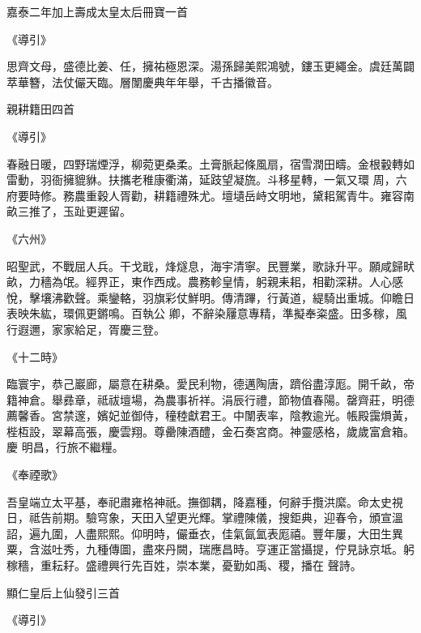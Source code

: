 \begin{pinyinscope}
 嘉泰二年加上壽成太皇太后冊寶一首



 《導引》



 思齊文母，盛德比姜、任，擁祐極恩深。湯孫歸美熙鴻號，鏤玉更繩金。虞廷萬闢萃華簪，法仗儼天臨。層闈慶典年年舉，千古播徽音。



 親耕籍田四首



 《導引》



 春融日暖，四野瑞煙浮，柳菀更桑柔。土膏脈起條風扇，宿雪潤田疇。金根轂轉如雷動，羽衙擁貔貅。扶攜老稚康衢滿，延跂望凝旒。斗移星轉，一氣又環
 周，六府要時修。務農重穀人胥勸，耕籍禮殊尤。壇壝岳峙文明地，黛耜駕青牛。雍容南畝三推了，玉趾更遲留。



 《六州》



 昭聖武，不戰屈人兵。干戈戢，烽燧息，海宇清寧。民豐業，歌詠升平。願咸歸畎畝，力穡為氓。經界正，東作西成。農務軫皇情，躬親耒耜，相勸深耕。人心感悅，擊壤沸歡聲。乘鑾輅，羽旗彩仗鮮明。傳清蹕，行黃道，緹騎出重城。仰瞻日表映朱紘，環佩更鏘鳴。百執公
 卿，不辭染屨意專精，準擬奉粢盛。田多稼，風行遐邇，家家給足，胥慶三登。



 《十二時》



 臨寰宇，恭己巖廊，屬意在耕桑。愛民利物，德邁陶唐，躋俗盡淳厖。開千畝，帝籍神倉。舉彞章，祗祓壇場，為農事祈祥。涓辰行禮，節物值春陽。罄齊莊，明德薦馨香。宮禁邃，嬪妃並御侍，穜稑獻君王。中闈表率，陰教逾光。帳殿靄熉黃，梐枑設，翠幕高張，慶雲翔。尊罍陳酒醴，金石奏宮商。神靈感格，歲歲富倉箱。慶
 明昌，行旅不繼糧。



 《奉禋歌》



 吾皇端立太平基，奉祀肅雍格神祇。撫御耦，降嘉種，何辭手攬洪縻。命太史視日，祗告前期。驗穹象，天田入望更光輝。掌禮陳儀，搜鉅典，迎春令，頒宣溫詔，遍九圍，人盡熙熙。仰明時，儼垂衣，佳氣氤氳表厖禧。豐年屢，大田生異粟，含滋吐秀，九種傳圖，盡來丹闕，瑞應昌時。亨運正當攝提，佇見詠京坻。躬稼穡，重耘耔。盛禮興行先百姓，崇本業，憂勤如禹、稷，播在
 聲詩。



 顯仁皇后上仙發引三首



 《導引》




\end{pinyinscope}
